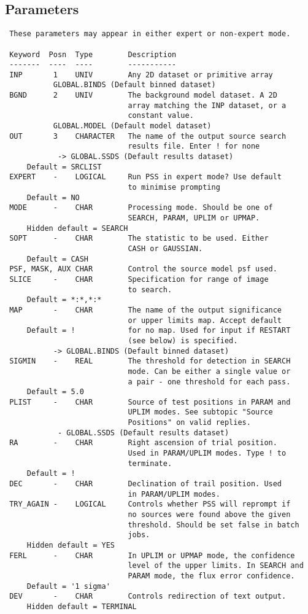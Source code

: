 \documentclass{book}
\renewcommand{\_}{{\tt\char'137}}     %
\begin{document}
\subsection{Parameters}
\begin{verbatim}
 These parameters may appear in either expert or non-expert mode.

 Keyword  Posn  Type        Description
 -------  ----  ----        -----------
 INP       1    UNIV        Any 2D dataset or primitive array
           GLOBAL.BINDS (Default binned dataset)
 BGND      2    UNIV        The background model dataset. A 2D
                            array matching the INP dataset, or a
                            constant value.
           GLOBAL.MODEL (Default model dataset)
 OUT       3    CHARACTER   The name of the output source search
                            results file. Enter ! for none
            -> GLOBAL.SSDS (Default results dataset)
     Default = SRCLIST
 EXPERT    -    LOGICAL     Run PSS in expert mode? Use default
                            to minimise prompting
     Default = NO
 MODE      -    CHAR        Processing mode. Should be one of
                            SEARCH, PARAM, UPLIM or UPMAP.
     Hidden default = SEARCH
 SOPT      -    CHAR        The statistic to be used. Either
                            CASH or GAUSSIAN.
     Default = CASH
 PSF, MASK, AUX CHAR        Control the source model psf used.
 SLICE     -    CHAR        Specification for range of image
                            to search.
     Default = *:*,*:*
 MAP       -    CHAR        The name of the output significance
                            or upper limits map. Accept default
     Default = !            for no map. Used for input if RESTART
                            (see below) is specified.
           -> GLOBAL.BINDS (Default binned dataset)
 SIGMIN    -    REAL        The threshold for detection in SEARCH
                            mode. Can be either a single value or
                            a pair - one threshold for each pass.
     Default = 5.0
 PLIST     -    CHAR        Source of test positions in PARAM and
                            UPLIM modes. See subtopic "Source
                            Positions" on valid replies.
            - GLOBAL.SSDS (Default results dataset)
 RA        -    CHAR        Right ascension of trial position.
                            Used in PARAM/UPLIM modes. Type ! to
                            terminate.
     Default = !
 DEC       -    CHAR        Declination of trail position. Used
                            in PARAM/UPLIM modes.
 TRY_AGAIN -    LOGICAL     Controls whether PSS will reprompt if
                            no sources were found above the given
                            threshold. Should be set false in batch
                            jobs.
     Hidden default = YES
 FERL      -    CHAR        In UPLIM or UPMAP mode, the confidence
                            level of the upper limits. In SEARCH and
                            PARAM mode, the flux error confidence.
     Default = '1 sigma'
 DEV       -    CHAR        Controls redirection of text output.
     Hidden default = TERMINAL


\end{verbatim}
\end{document}
